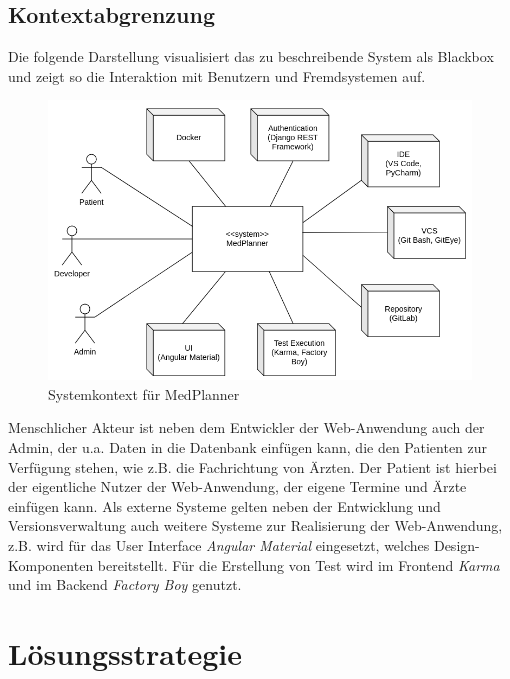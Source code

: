\documentclass[conference]{IEEEtran}
\begin{document}
\subsection{Kontextabgrenzung}
Die folgende Darstellung visualisiert das zu beschreibende System als Blackbox und zeigt so die Interaktion mit Benutzern und Fremdsystemen auf.
\begin{figure}[!h]
	\centering
	\includegraphics[width=0.9\columnwidth]{./figures/system_context_medplanner}
	\caption{Systemkontext für MedPlanner}
\end{figure}

Menschlicher Akteur ist neben dem Entwickler der Web-Anwendung auch der Admin, der u.a. Daten in die Datenbank einfügen kann, die den Patienten zur Verfügung stehen, wie z.B. die Fachrichtung von Ärzten. Der Patient ist hierbei der eigentliche Nutzer der Web-Anwendung, der eigene Termine und Ärzte einfügen kann. Als externe Systeme gelten neben der Entwicklung und Versionsverwaltung auch weitere Systeme zur Realisierung der Web-Anwendung, z.B. wird für das User Interface \textit{Angular Material} eingesetzt, welches Design-Komponenten bereitstellt. Für die Erstellung von Test wird im Frontend \textit{Karma} und im Backend \textit{Factory Boy} genutzt.

\section{Lösungsstrategie}
\end{document}
